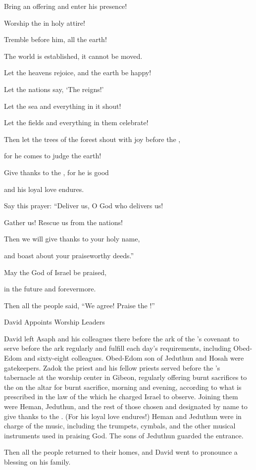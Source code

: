 {\par }{\Q Bring
an offering
and enter
his presence!
\par }{\Q Worship
the {}
in holy
attire!
\par }{\Q {}Tremble
before
him, all
the earth!
\par }{\Q The world
is established,
it cannot
be moved.
\par }{\Q {}Let
the heavens
rejoice,
and the earth
be happy!
\par }{\Q Let the nations
say, ‘The
{}
reigns!’
\par }{\Q {}Let
the sea
and everything
in it shout!
\par }{\Q Let
the fields
and everything
in them celebrate!
\par }{\Q {}Then
let the trees
of the forest
shout
with joy before
the {},
\par }{\Q for
he comes
to judge
the earth!
\par }{\Q {}Give thanks
to the
{}, for
he is good
\par }{\Q and his loyal love
endures.
\par }{\Q {}Say
this prayer: “Deliver
us, O God
who delivers
us!
\par }{\Q Gather
us! Rescue
us from
the nations!
\par }{\Q Then we will give thanks
to your holy
name,
\par }{\Q and boast
about your praiseworthy deeds.”
\par }{\Q {}May the
{}
God
of Israel
be praised,
\par }{\Q in the future
and forevermore.
\par }{\Q Then all
the people
said, “We agree! Praise
the {}!”
\par }{\SH David Appoints Worship Leaders
\par }{\PP {}David left
Asaph
and his colleagues
there
before
the ark
of the
{}’s
covenant
to serve
before
the ark
regularly
and fulfill
each day’s
requirements,
including Obed-Edom
and sixty-eight
colleagues.
Obed-Edom
son
of Jeduthun
and Hosah
were gatekeepers.
Zadok
the priest
and his fellow
priests
served before
the
{}’s
tabernacle
at the worship center
in Gibeon,
regularly
offering
burnt sacrifices
to the
{}
on
the altar
for burnt sacrifice,
morning
and evening,
according to what is prescribed
in the law
of the {}
which
he charged
Israel to observe.
Joining
them were Heman,
Jeduthun,
and the rest
of those chosen
and designated
by name
to give thanks
to the
{}. (For
his loyal love
endures!)
Heman
and Jeduthun
were in charge of the music, including the trumpets,
cymbals,
and the other musical
instruments
used
in praising
God.
The sons
of Jeduthun
guarded the entrance.
\par }{\PP {}Then
all
the people
returned to their homes,
and David
went to pronounce a blessing
on his family.

}
